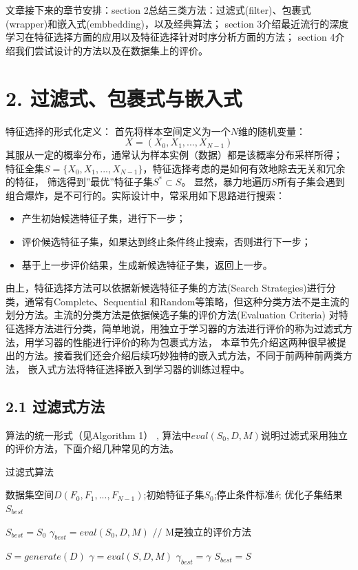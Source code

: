\documentclass[a4paper,UTF8]{article}
\begin{document}
  文章接下来的章节安排：section 2总结三类方法：过滤式(filter)、包裹式(wrapper)和嵌入式(embbedding)，以及经典算法；
  section 3介绍最近流行的深度学习在特征选择方面的应用以及特征选择针对时序分析方面的方法；
  section 4介绍我们尝试设计的方法以及在数据集上的评价。


\section*{2. 过滤式、包裹式与嵌入式}
  特征选择的形式化定义：
  首先将样本空间定义为一个$ N $维的随机变量：
  $$X = (X_{0}, X_{1}, ... , X_{N-1})$$
  其服从一定的概率分布，通常认为样本实例（数据）都是该概率分布采样所得；
  特征全集$S = \{X_{0}, X_{1}, ... , X_{N-1} \}$，特征选择考虑的是如何有效地除去无关和冗余的特征，
  筛选得到”最优”特征子集$S^{*} \subset S$。
  显然，暴力地遍历$ S $所有子集会遇到组合爆炸，是不可行的。实际设计中，常采用如下思路进行搜索：

  \begin{itemize}

    \item 产生初始候选特征子集，进行下一步；
    \item 评价候选特征子集，如果达到终止条件终止搜索，否则进行下一步；
    \item 基于上一步评价结果，生成新候选特征子集，返回上一步。

  \end{itemize}
  由上，特征选择方法可以依据新候选特征子集的方法(Search Strategies)进行分类，通常有Complete、Sequential
  和Random等策略，但这种分类方法不是主流的划分方法。主流的分类方法是依据候选子集的评价方法(Evaluation Criteria)
  对特征选择方法进行分类，简单地说，用独立于学习器的方法进行评价的称为过滤式方法，用学习器的性能进行评价的称为包裹式方法，
  本章节先介绍这两种很早被提出的方法。接着我们还会介绍后续巧妙独特的嵌入式方法，不同于前两种前两类方法，
  嵌入式方法将特征选择嵌入到学习器的训练过程中。


\subsection*{2.1 过滤式方法}
  算法的统一形式（见Algorithm 1）
  \cite{DBLP:journals/tkde/LiuY05}
  ,  算法中$ eval(S_{0}, D, M)$说明过滤式采用独立的评价方法，下面介绍几种常见的方法。

  \begin{algorithm}
    \caption{过滤式算法}
    \begin{algorithmic}[1]
      \REQUIRE 数据集空间$D(F_{0}, F_{1},..., F_{N-1})$;初始特征子集$S_{0}$;停止条件标准$\delta$;
      \ENSURE 优化子集结果$S_{best}$

      \STATE $S_{best}=S_{0}$
      \STATE $\gamma_{best}=eval(S_{0},D,M)$          $//$ M是独立的评价方法

        \STATE $S=generate(D)$
        \STATE $\gamma=eval(S,D,M)$
            \STATE $\gamma_{best}=\gamma$
            \STATE $S_{best}=S$
          \ENDIF
      \ENDWHILE


    \end{algorithmic}
  \end{algorithm}
\end{document}
